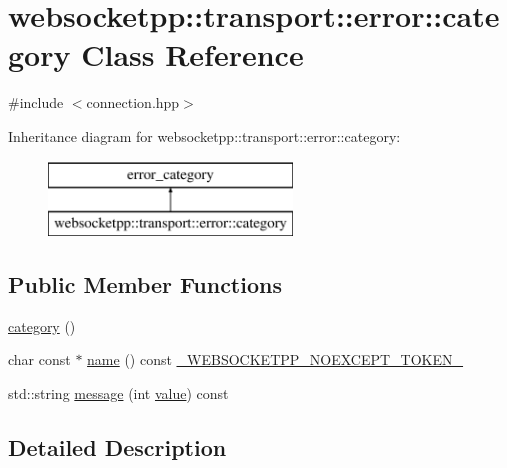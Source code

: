 \hypertarget{classwebsocketpp_1_1transport_1_1error_1_1category}{}\section{websocketpp\+:\+:transport\+:\+:error\+:\+:category Class Reference}
\label{classwebsocketpp_1_1transport_1_1error_1_1category}


{\ttfamily \#include $<$connection.\+hpp$>$}

Inheritance diagram for websocketpp\+:\+:transport\+:\+:error\+:\+:category\+:\begin{figure}[H]
\begin{center}
\leavevmode
\includegraphics[height=2.000000cm]{classwebsocketpp_1_1transport_1_1error_1_1category}
\end{center}
\end{figure}
\subsection*{Public Member Functions}
\begin{DoxyCompactItemize}
\item 
\hyperlink{classwebsocketpp_1_1transport_1_1error_1_1category_ac06b7e9707ab65a6560be0e15d9f44da}{category} ()
\item 
char const $\ast$ \hyperlink{classwebsocketpp_1_1transport_1_1error_1_1category_a326b11bd1d14a180089f0562e18c3426}{name} () const \hyperlink{boost__config_8hpp_aa19747404a5f2fe9c9eb9e9d2e48f26c}{\+\_\+\+W\+E\+B\+S\+O\+C\+K\+E\+T\+P\+P\+\_\+\+N\+O\+E\+X\+C\+E\+P\+T\+\_\+\+T\+O\+K\+E\+N\+\_\+}
\item 
std\+::string \hyperlink{classwebsocketpp_1_1transport_1_1error_1_1category_a05329f3cabde2a66991329ac27c0099a}{message} (int \hyperlink{namespacewebsocketpp_1_1transport_1_1error_a8d371a2562d813e5a2e106e2694d4fb0}{value}) const 
\end{DoxyCompactItemize}


\subsection{Detailed Description}


